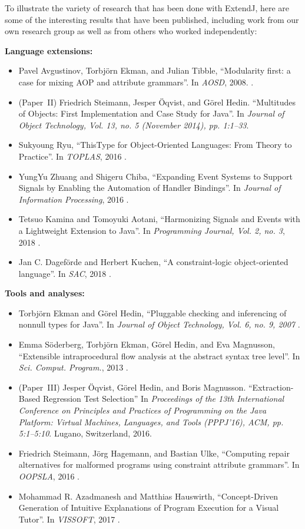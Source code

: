\documentclass[10pt, twoside, openright]{book}
\newcommand{\paperIIref}{%
Friedrich Steimann, Jesper Öqvist, and Görel Hedin.
``Multitudes of Objects: First Implementation and Case Study for Java''.
In \emph{Journal of Object Technology, Vol. 13, no. 5 (November 2014), pp. 1:1--33}.
}
\newcommand{\paperIIIref}{%
Jesper Öqvist, Görel Hedin, and Boris Magnusson.
``Extraction-Based Regression Test Selection''
In \emph{Proceedings of the 13th International Conference on Principles and
Practices of Programming on the Java Platform: Virtual Machines, Languages, and Tools (PPPJ'16), ACM,
pp. 5:1--5:10}. Lugano, Switzerland, 2016.
}
\begin{document}
To illustrate the variety of research that has been done with ExtendJ,
here are some of the interesting results that have been published,
including work from our own research group as well as from others who worked independently:

\goodbreak
{\raggedright
\vspace{1em}
\noindent
\textbf{Language extensions:}

\begin{itemize}
  \item
    Pavel Avgustinov, Torbj{\"{o}}rn Ekman, and Julian Tibble,
    ``Modularity first: a case for mixing {AOP} and attribute grammars''.
    In \emph{AOSD}, 2008.
    \cite{DBLP:conf/aosd/AvgustinovET08}.
  \item
    (Paper~II) \paperIIref
  \item
    Sukyoung Ryu,
    ``ThisType for Object-Oriented Languages: From Theory to Practice''.
    In \emph{TOPLAS}, 2016 \cite{DBLP:journals/toplas/Ryu16}.
  \item
    YungYu Zhuang and Shigeru Chiba,
    ``Expanding Event Systems to Support Signals by Enabling the Automation of Handler Bindings''.
    In \emph{Journal of Information Processing}, 2016 \cite{DBLP:journals/jip/ZhuangC16}.
  \item
    Tetsuo Kamina and Tomoyuki Aotani,
    ``Harmonizing Signals and Events with a Lightweight Extension to Java''.
    In \emph{Programming Journal, Vol. 2, no. 3}, 2018 \cite{DBLP:journals/programming/KaminaA18}.
  \item
    Jan C. Dagef{\"{o}}rde and Herbert Kuchen,
    ``A constraint-logic object-oriented language''.
    In \emph{SAC}, 2018 \cite{DBLP:conf/sac/DagefordeK18}.
\end{itemize}

\goodbreak
\noindent
\textbf{Tools and analyses:}

\begin{itemize}
  \item
    Torbj{\"{o}}rn Ekman and G{\"{o}}rel Hedin,
    ``Pluggable checking and inferencing of nonnull types for Java''.
    In \emph{Journal of Object Technology, Vol. 6, no. 9, 2007}
    \cite{DBLP:journals/jot/EkmanH07}.
  \item
    Emma S{\"{o}}derberg, Torbj{\"{o}}rn Ekman, G{\"{o}}rel Hedin, and Eva Magnusson,
    ``Extensible intraprocedural flow analysis at the abstract syntax tree level''.
    In \emph{Sci. Comput. Program.}, 2013 \cite{DBLP:journals/scp/SoderbergEHM13}.
  \item
    (Paper~III) \paperIIIref
  \item
    Friedrich Steimann, J{\"{o}}rg Hagemann, and Bastian Ulke,
    ``Computing repair alternatives for malformed programs using constraint attribute grammars''.
    In \emph{OOPSLA}, 2016 \cite{DBLP:conf/oopsla/SteimannHU16}.
  \item
    Mohammad R. Azadmanesh and Matthias Hauswirth,
    ``Concept-Driven Generation of Intuitive Explanations of Program Execution for a Visual Tutor''.
    In \emph{VISSOFT}, 2017 \cite{DBLP:conf/vissoft/AzadmaneshH17}.
\end{itemize}
}%
\end{document}
